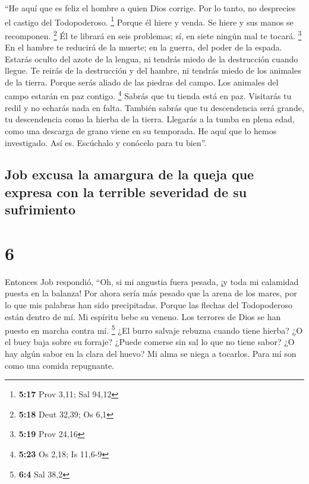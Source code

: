  ``He aquí que es feliz el hombre a quien Dios corrige.
Por lo tanto, no desprecies el castigo del Todopoderoso. \footnote{\textbf{5:17}
  Prov 3,11; Sal 94,12}  Porque él hiere y venda. Se
hiere y sus manos se recomponen. \footnote{\textbf{5:18} Deut 32,39; Os
  6,1}  Él te librará en seis problemas; sí, en siete
ningún mal te tocará. \footnote{\textbf{5:19} Prov 24,16}
 En el hambre te reducirá de la muerte; en la guerra, del
poder de la espada.  Estarás oculto del azote de la
lengua, ni tendrás miedo de la destrucción cuando llegue.
 Te reirás de la destrucción y del hambre, ni tendrás
miedo de los animales de la tierra.  Porque serás aliado
de las piedras del campo. Los animales del campo estarán en paz contigo.
\footnote{\textbf{5:23} Os 2,18; Is 11,6-9}  Sabrás que
tu tienda está en paz. Visitarás tu redil y no echarás nada en falta.
 También sabrás que tu descendencia será grande, tu
descendencia como la hierba de la tierra.  Llegarás a la
tumba en plena edad, como una descarga de grano viene en su temporada.
 He aquí que lo hemos investigado. Así es. Escúchalo y
conócelo para tu bien''.

\hypertarget{job-excusa-la-amargura-de-la-queja-que-expresa-con-la-terrible-severidad-de-su-sufrimiento}{%
\subsection{Job excusa la amargura de la queja que expresa con la
terrible severidad de su
sufrimiento}\label{job-excusa-la-amargura-de-la-queja-que-expresa-con-la-terrible-severidad-de-su-sufrimiento}}

\hypertarget{section-5}{%
\section{6}\label{section-5}}

 Entonces Job respondió,  ``Oh, si mi
angustia fuera pesada, ¡y toda mi calamidad puesta en la balanza!
 Por ahora sería más pesado que la arena de los mares, por
lo que mis palabras han sido precipitadas.  Porque las
flechas del Todopoderoso están dentro de mí. Mi espíritu bebe su veneno.
Los terrores de Dios se han puesto en marcha contra mí. \footnote{\textbf{6:4}
  Sal 38,2}  ¿El burro salvaje rebuzna cuando tiene
hierba? ¿O el buey baja sobre su forraje?  ¿Puede comerse
sin sal lo que no tiene sabor? ¿O hay algún sabor en la clara del huevo?
 Mi alma se niega a tocarlos. Para mí son como una comida
repugnante.

